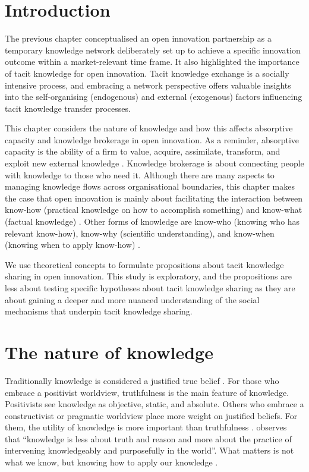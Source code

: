 
\section{Introduction}

The previous chapter conceptualised an open innovation partnership as a temporary knowledge network deliberately set up to achieve a specific innovation outcome within a market-relevant time frame. It also highlighted the importance of tacit knowledge for open innovation. Tacit knowledge exchange is a socially intensive process, and embracing a network perspective offers valuable insights into the self-organising (endogenous) and external (exogenous) factors influencing tacit knowledge transfer processes. \medskip

This chapter considers the nature of knowledge and how this affects absorptive capacity and knowledge brokerage in open innovation. As a reminder, absorptive capacity is the ability of a firm to value, acquire, assimilate, transform, and exploit new external knowledge \citep{cohen1990absorptive}. Knowledge brokerage is about connecting people with knowledge to those who need it. Although there are many aspects to managing knowledge flows across organisational boundaries, this chapter makes the case that open innovation is mainly about facilitating the interaction between know-how (practical knowledge on how to accomplish something) and know-what (factual knowledge) \citep{winter1987knowledge,garud1997distinction}. Other forms of knowledge are know-who (knowing who has relevant know-how), know-why (scientific understanding), and know-when (knowing when to apply know-how) \citep{hulme2014editorial}. \medskip

We use theoretical concepts to formulate propositions about tacit knowledge sharing in open innovation. This study is exploratory, and the propositions are less about testing specific hypotheses about tacit knowledge sharing as they are about gaining a deeper and more nuanced understanding of the social mechanisms that underpin tacit knowledge sharing. 

\section{The nature of knowledge}

Traditionally knowledge is considered a justified true belief \citep{bolisani2018elusive}. For those who embrace a positivist worldview, truthfulness is the main feature of knowledge. Positivists see knowledge as objective, static, and absolute. Others who embrace a constructivist or pragmatic worldview place more weight on justified beliefs. For them, the utility of knowledge is more important than truthfulness \citep{bolisani2018elusive}. \citet{spender1996organizational} observes that \enquote{knowledge is less about truth and reason and more about the practice of intervening knowledgeably and purposefully in the world}. What matters is not what we know, but knowing how to apply our knowledge \citep{ryle1949concept,orlikowski2002knowing}. \medskip

